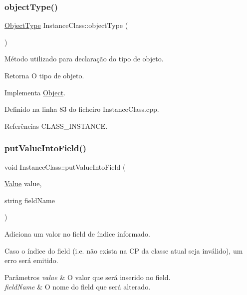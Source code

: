 \subsubsection{\texorpdfstring{object\+Type()}{objectType()}}
{\footnotesize\ttfamily \hyperlink{BasicTypes_8h_a842c5e2e69277690b064bf363c017980}{Object\+Type} Instance\+Class\+::object\+Type (\begin{DoxyParamCaption}{ }\end{DoxyParamCaption})\hspace{0.3cm}{\ttfamily [virtual]}}



Método utilizado para declaração do tipo de objeto. 

\begin{DoxyReturn}{Retorna}
O tipo de objeto. 
\end{DoxyReturn}


Implementa \hyperlink{classObject_a08cee945bc224fc81f4448086625183d}{Object}.



Definido na linha 83 do ficheiro Instance\+Class.\+cpp.



Referências C\+L\+A\+S\+S\+\_\+\+I\+N\+S\+T\+A\+N\+CE.

\mbox{\label{classInstanceClass_af445c2e244c91b6cce4bb2c2798a720c}} 
\subsubsection{\texorpdfstring{put\+Value\+Into\+Field()}{putValueIntoField()}}
{\footnotesize\ttfamily void Instance\+Class\+::put\+Value\+Into\+Field (\begin{DoxyParamCaption}\item[{\hyperlink{structValue}{Value}}]{value,  }\item[{string}]{field\+Name }\end{DoxyParamCaption})}



Adiciona um valor no field de índice informado. 

Caso o índice do field (i.\+e. não exista na CP da classe atual seja inválido), um erro será emitido. 
\begin{DoxyParams}{Parâmetros}
{\em value} & O valor que será inserido no field. \\
\hline
{\em field\+Name} & O nome do field que será alterado. \\
\hline
\end{DoxyParams}


